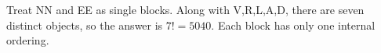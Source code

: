 Treat NN and EE as single blocks. Along with V,R,L,A,D, there are seven distinct objects, so the answer is $\boxed{7!=5040}$. Each block has only one internal ordering.
